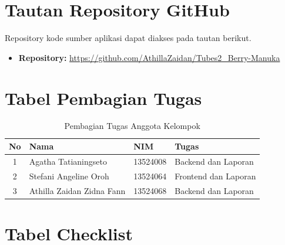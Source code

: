 
\section{Tautan Repository GitHub}
 
Repository kode sumber aplikasi dapat diakses pada tautan berikut.
 
\begin{itemize}
    \item \textbf{Repository:} \url{https://github.com/AthillaZaidan/Tubes2_Berry-Manuka}
\end{itemize}
 

\section{Tabel Pembagian Tugas}
 
\begin{table}[H]
\centering
\caption{Pembagian Tugas Anggota Kelompok}
\label{tab:pembagian-tugas}
\renewcommand{\arraystretch}{1.5}
\begin{tabular}{|c|p{3.5cm}|p{2.5cm}|p{5cm}|}
\hline
\textbf{No} & \textbf{Nama} & \textbf{NIM} & \textbf{Tugas} \\
\hline
1 & Agatha Tatianingseto & 13524008 & Backend dan Laporan \\
\hline
2 & Stefani Angeline Oroh & 13524064 & Frontend dan Laporan \\
\hline
3 & Athilla Zaidan Zidna Fann & 13524068 & Backend dan Laporan \\
\hline
\end{tabular}
\end{table}
 

\section{Tabel Checklist}
 
